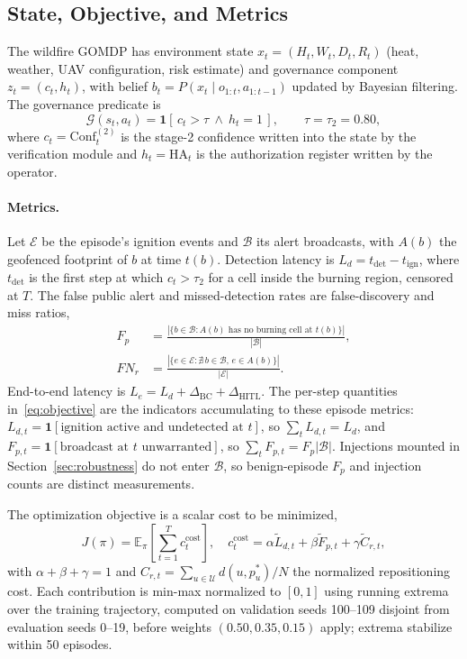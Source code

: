 \documentclass[letterpaper]{article} %
\newcommand{\E}{\mathbb{E}}
\newcommand{\GOMDP}{\text{GOMDP}}
\newcommand{\Conf}{\text{Conf}}
\newcommand{\HA}{\text{HA}}
\newcommand{\Le}{L_e}
\newcommand{\calG}{\mathcal{G}}
\newcommand{\calU}{\mathcal{U}}
\newcommand{\calB}{\mathcal{B}}
\newcommand{\calE}{\mathcal{E}}
\begin{document}
\subsection{State, Objective, and Metrics}
\label{sec:objective}

The wildfire $\GOMDP$ has environment state $x_t=(H_t,W_t,D_t,R_t)$ (heat, weather, UAV configuration, risk estimate) and governance component $z_t=(c_t,h_t)$, with belief $b_t=P(x_t\mid o_{1:t},a_{1:t-1})$ updated by Bayesian filtering. The governance predicate is
\begin{equation}
\calG(s_t,a_t)=\mathbf{1}\!\left[\,c_t>\tau \ \wedge\ h_t=1\,\right], \qquad \tau=\tau_2=0.80,
\label{eq:governance}
\end{equation}
where $c_t=\Conf_t^{(2)}$ is the stage-2 confidence written into the state by the verification module and $h_t=\HA_t$ is the authorization register written by the operator.

\paragraph{Metrics.} Let $\calE$ be the episode's ignition events and $\calB$ its alert broadcasts, with $A(b)$ the geofenced footprint of $b$ at time $t(b)$. Detection latency is $L_d=t_{\mathrm{det}}-t_{\mathrm{ign}}$, where $t_{\mathrm{det}}$ is the first step at which $c_t>\tau_2$ for a cell inside the burning region, censored at $T$. The false public alert and missed-detection rates are false-discovery and miss ratios,
\begin{equation}
\begin{aligned}
F_p&=\frac{|\{b\in\calB: A(b) \text{ has no burning cell at } t(b)\}|}{|\calB|},\\
FN_r&=\frac{|\{e\in\calE: \nexists\, b\in\calB,\, e\in A(b)\}|}{|\calE|}.
\end{aligned}
\label{eq:fp}
\end{equation}
End-to-end latency is $\Le=L_d+\Delta_{\mathrm{BC}}+\Delta_{\mathrm{HITL}}$. The per-step quantities in~\eqref{eq:objective} are the indicators accumulating to these episode metrics: $L_{d,t}=\mathbf{1}[\text{ignition active and undetected at } t]$, so $\sum_t L_{d,t}=L_d$, and $F_{p,t}=\mathbf{1}[\text{broadcast at } t \text{ unwarranted}]$, so $\sum_t F_{p,t}=F_p|\calB|$. Injections mounted in Section~\ref{sec:robustness} do not enter $\calB$, so benign-episode $F_p$ and injection counts are distinct measurements.

The optimization objective is a scalar cost to be minimized,
\begin{equation}
J(\pi)=\E_\pi\!\left[\textstyle\sum_{t=1}^{T} c^{\mathrm{cost}}_t\right], \quad c^{\mathrm{cost}}_t=\alpha\tilde{L}_{d,t}+\beta\tilde{F}_{p,t}+\gamma\tilde{C}_{r,t},
\label{eq:objective}
\end{equation}
with $\alpha+\beta+\gamma=1$ and $C_{r,t}=\sum_{u\in\calU} d(u,p^*_u)/N$ the normalized repositioning cost. Each contribution is min-max normalized to $[0,1]$ using running extrema over the training trajectory, computed on validation seeds 100--109 disjoint from evaluation seeds 0--19, before weights $(0.50,0.35,0.15)$ apply; extrema stabilize within 50 episodes.
\end{document}

